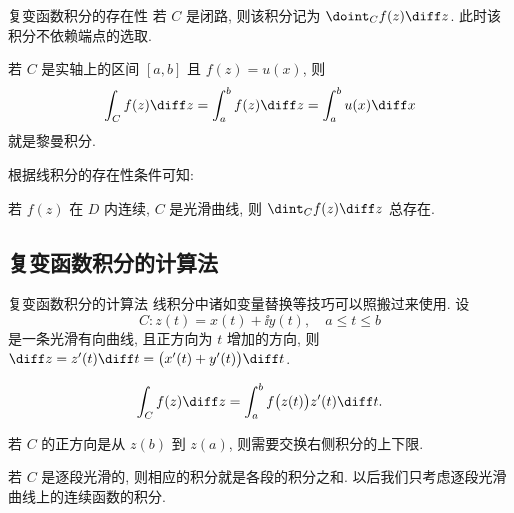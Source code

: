 \begin{frame}{复变函数积分的存在性}
	\onslide<+->
	若 $C$ 是闭路, 则该积分记为 \alert{$\doint_Cf(z)\diff z$}.
	\onslide<+->
	此时该积分不依赖端点的选取.

	\onslide<+->
	若 $C$ 是实轴上的区间 $[a,b]$ 且 $f(z)=u(x)$, 
	\onslide<+->
	则
	\[
		\int_Cf(z)\diff z=\int_a^bf(z)\diff z=\int_a^b u(x)\diff x
	\]
	就是黎曼积分.

	\onslide<+->
	根据线积分的存在性条件可知:
	\onslide<+->
	\begin{theorem}
		若 $f(z)$ 在 $D$ 内连续, $C$ 是光滑曲线, 则 $\dint_Cf(z)\diff z$ 总存在.
	\end{theorem}
\end{frame}


\subsection{复变函数积分的计算法}

\begin{frame}{复变函数积分的计算法}
	\onslide<+->
	线积分中诸如变量替换等技巧可以照搬过来使用.
	\onslide<+->
	设
	\[
		C:z(t)=x(t)+\ii y(t),\quad a\le t\le b
	\]
	是一条光滑有向曲线, 且正方向为 $t$ 增加的方向,
	\onslide<+->
	则 $\diff z=z'(t)\diff t=\bigl(x'(t)+y'(t)\bigr)\diff t$.
	\onslide<+->
	\begin{theorem*}
		\[
			\int_Cf(z)\diff z=\int_a^b f\bigl(z(t)\bigr)z'(t)\diff t.
		\]
	\end{theorem*}
	\onslide<+->
	若 $C$ 的正方向是从 $z(b)$ 到 $z(a)$, 则需要交换右侧积分的上下限.

	\onslide<+->
	若 $C$ 是逐段光滑的, 则相应的积分就是各段的积分之和.
	\onslide<+->
	以后我们\alert{只考虑逐段光滑曲线上的连续函数的积分}.
\end{frame}


